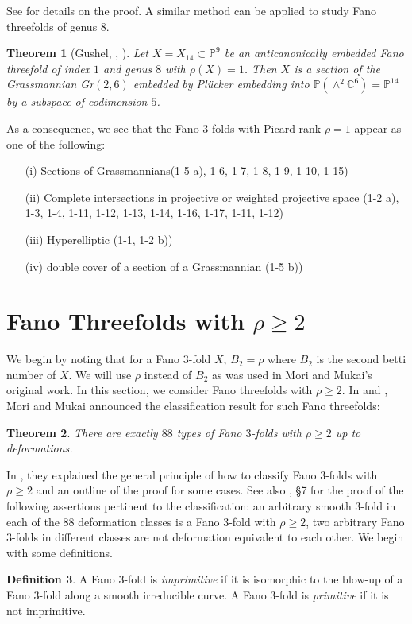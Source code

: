 \documentclass[11pt]{amsart}
\theoremstyle{plain}
\newtheorem{theorem}{Theorem}[section]
\theoremstyle{definition}
\newtheorem{definition}[theorem]{Definition}
\theoremstyle{expl}
\begin{document}
See \cite{Gus6} for details on the proof.
A similar method can be applied to study Fano threefolds of genus $8$. 
\begin{theorem}[Gushel, \cite{Gus83}, \cite{Gus92}]
    Let $X=X_{14} \subset \mathbb{P}^9$ be an anticanonically embedded Fano threefold of index $1$ and genus $8$ with $\rho(X)=1$. Then $X$ is a section of the Grassmannian Gr$(2,6)$ embedded by Pl\"{u}cker embedding into $\mathbb{P}(\wedge^2 \mathbb{C}^6) = \mathbb{P}^{14}$ by a subspace of codimension $5$.
\end{theorem}
\medbreak
As a consequence, we see that the Fano $3$-folds with Picard rank $\rho =1$ appear as one of the following: 
\begin{enumerate}
    \item[(i)] Sections of Grassmannians(1-5 a), 1-6, 1-7, 1-8, 1-9, 1-10, 1-15)
    \item[(ii)] Complete intersections in projective or weighted projective space (1-2 a), 1-3, 1-4, 1-11, 1-12, 1-13, 1-14, 1-16, 1-17, 1-11, 1-12)
    \item[(iii)] Hyperelliptic (1-1, 1-2 b))
    \item[(iv)] double cover of a section of a Grassmannian (1-5 b))
\end{enumerate}

\section{Fano Threefolds with $\rho \geq 2$}
We begin by noting that for a Fano $3$-fold $X$, $B_2 =\rho$ where $B_2$ is the second betti number of $X$. We will use $\rho$ instead of $B_2$ as was used in Mori and Mukai's original work. 
In this section, we consider Fano threefolds with $\rho \geq 2$. 
In \cite{MM81} and \cite{MM03}, Mori and Mukai announced the classification result for such Fano threefolds: 
	\begin{theorem}
	There are exactly $88$ types of Fano $3$-folds with $\rho \geq 2$ up to deformations.
	\end{theorem}
In \cite{MM83}, they explained the general principle of how to classify Fano $3$-folds with $\rho \geq 2$ and an outline of the proof for some cases. See also \cite{MM85}, \S 7 for the proof of the following assertions pertinent to the classification:
an arbitrary smooth $3$-fold in each of the $88$ deformation classes is a Fano $3$-fold with $\rho \geq 2$, two arbitrary Fano $3$-folds in different classes are not deformation equivalent to each other.
	We begin with some definitions. 
	\begin{definition}
		A Fano $3$-fold is \textit{imprimitive} if it is isomorphic to the blow-up of a Fano $3$-fold along a smooth irreducible curve. A Fano $3$-fold is \textit{primitive} if it is not imprimitive.
	\end{definition}
\end{document}
